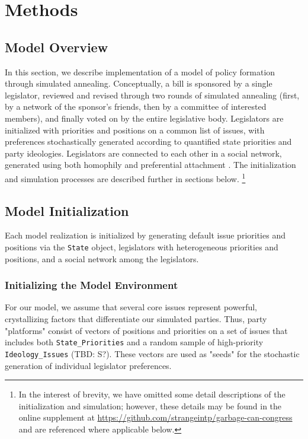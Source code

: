 \documentclass[pdftex,12pt]{llncs}
\begin{document}
\section{Methods}
%
%

\subsection{Model Overview}
In this section, we describe implementation of a model of policy formation through simulated annealing.
Conceptually, a bill is sponsored by a single legislator, reviewed and revised through two rounds of simulated annealing (first, by a network of the sponsor's friends, then by a committee of interested members), and finally voted on by the entire legislative body.
Legislators are initialized with priorities and positions on a common list of issues, with preferences stochastically generated according to quantified state priorities and party ideologies.
Legislators are connected to each other in a social network, generated using both homophily \parencite{msc01, br11} and preferential attachment \parencite{Barabasi1999}.
The initialization and simulation processes are described further in sections below.
\footnote{In the interest of brevity, we have omitted some detail descriptions of the initialization and simulation; however, these details may be found in the online supplement at \url{https://github.com/strangeintp/garbage-can-congress} and are referenced where applicable below.}

\subsection{Model Initialization}
Each model realization is initialized by generating default issue priorities and positions via the \texttt{State} object, legislators with heterogeneous priorities and positions, and a social network among the legislators.

\subsubsection{Initializing the Model Environment}
For our model, we assume that several core issues represent powerful, crystallizing factors that differentiate our simulated parties.
Thus, party "platforms" consist of vectors of positions and priorities on a set of issues that includes both \texttt{State\_Priorities} and a random sample of high-priority \texttt{Ideology\_Issues} (TBD: S?).
These vectors are used as "seeds" for the stochastic generation of individual legislator preferences.
\end{document}
